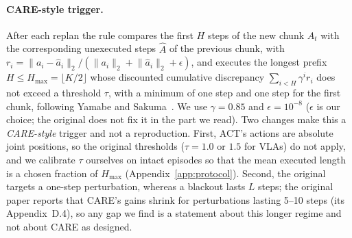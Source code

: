 \documentclass[11pt]{article}
\begin{document}
\paragraph{CARE-style trigger.} After each replan the rule compares the first $H$ steps of the new chunk $A_t$ with the corresponding unexecuted steps $\hat A$ of the previous chunk, with $r_i=\lVert a_i-\hat a_i\rVert_2/(\lVert a_i\rVert_2+\lVert\hat a_i\rVert_2+\epsilon)$, and executes the longest prefix $H\le H_{\max}=\lfloor K/2\rfloor$ whose discounted cumulative discrepancy $\sum_{i<H}\gamma^i r_i$ does not exceed a threshold $\tau$, with a minimum of one step and one step for the first chunk, following Yamabe and Sakuma~\cite{yamabe2026care}. We use $\gamma=0.85$ and $\epsilon=10^{-8}$ ($\epsilon$ is our choice; the original does not fix it in the part we read). Two changes make this a \emph{CARE-style} trigger and not a reproduction. First, ACT's actions are absolute joint positions, so the original thresholds ($\tau=1.0$ or $1.5$ for VLAs) do not apply, and we calibrate $\tau$ ourselves on intact episodes so that the mean executed length is a chosen fraction of $H_{\max}$ (Appendix~\ref{app:protocol}). Second, the original targets a one-step perturbation, whereas a blackout lasts $L$ steps; the original paper reports that CARE's gains shrink for perturbations lasting 5--10 steps (its Appendix~D.4), so any gap we find is a statement about this longer regime and not about CARE as designed.
\end{document}

